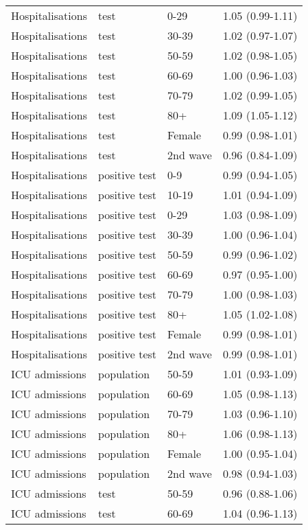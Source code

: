 \documentclass{article}
\begin{document}
\begin{longtable}{llll}
		Hospitalisations & test & 0-29 & 1.05 (0.99-1.11) \\ 
		Hospitalisations & test & 30-39 & 1.02 (0.97-1.07) \\ 
		Hospitalisations & test & 50-59 & 1.02 (0.98-1.05) \\ 
		Hospitalisations & test & 60-69 & 1.00 (0.96-1.03) \\ 
		Hospitalisations & test & 70-79 & 1.02 (0.99-1.05) \\ 
		Hospitalisations & test & 80+ & 1.09 (1.05-1.12) \\ 
		Hospitalisations & test & Female & 0.99 (0.98-1.01) \\ 
		Hospitalisations & test & 2nd wave & 0.96 (0.84-1.09) \\ 
		Hospitalisations & positive test & 0-9 & 0.99 (0.94-1.05) \\ 
		Hospitalisations & positive test & 10-19 & 1.01 (0.94-1.09) \\ 
		Hospitalisations & positive test & 0-29 & 1.03 (0.98-1.09) \\ 
		Hospitalisations & positive test & 30-39 & 1.00 (0.96-1.04) \\ 
		Hospitalisations & positive test & 50-59 & 0.99 (0.96-1.02) \\ 
		Hospitalisations & positive test & 60-69 & 0.97 (0.95-1.00) \\ 
		Hospitalisations & positive test & 70-79 & 1.00 (0.98-1.03) \\ 
		Hospitalisations & positive test & 80+ & 1.05 (1.02-1.08) \\ 
		Hospitalisations & positive test & Female & 0.99 (0.98-1.01) \\ 
		Hospitalisations & positive test & 2nd wave & 0.99 (0.98-1.01) \\ 
		ICU admissions & population & 50-59 & 1.01 (0.93-1.09) \\ 
		ICU admissions & population & 60-69 & 1.05 (0.98-1.13) \\ 
		ICU admissions & population & 70-79 & 1.03 (0.96-1.10) \\ 
		ICU admissions & population & 80+ & 1.06 (0.98-1.13) \\ 
		ICU admissions & population & Female & 1.00 (0.95-1.04) \\ 
		ICU admissions & population & 2nd wave & 0.98 (0.94-1.03) \\ 
		ICU admissions & test & 50-59 & 0.96 (0.88-1.06) \\ 
		ICU admissions & test & 60-69 & 1.04 (0.96-1.13) \\ 

\end{longtable}
\end{document}
